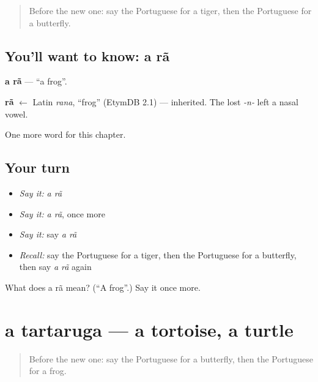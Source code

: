 \label{lesson:PT-C118-ra}



\begin{quote}
Before the new one: say the Portuguese for a tiger, then the Portuguese for a butterfly.
\end{quote}

\subsection*{You'll want to know: a rã}
\textbf{a rã} — \textquotedblleft{}a frog\textquotedblright{}.

\begin{cousinweb}
\textbf{rã} $\leftarrow$ Latin \emph{rana}, \textquotedblleft{}frog\textquotedblright{} (EtymDB 2.1) — inherited. The lost \emph{-n-} left a nasal vowel.
\end{cousinweb}

\begin{grammarlens}[title={What you've built}]
One more word for this chapter.
\end{grammarlens}

\subsection*{Your turn}
\begin{itemize}
\raggedright
  \item \emph{Say it:} \emph{a rã}
  \item \emph{Say it:} \emph{a rã}, once more
  \item \emph{Say it:} say \emph{a rã}
  \item \emph{Recall:} say the Portuguese for a tiger, then the Portuguese for a butterfly, then say \emph{a rã} again
\end{itemize}

\begin{tcolorbox}[breakable,colback=teal!4,colframe=teal!35!black,title={Before you move on}]
What does a rã mean? (\textquotedblleft{}A frog\textquotedblright{}.) Say it once more.
\end{tcolorbox}
\section[a tartaruga]{a tartaruga — a tortoise, a turtle}

\label{lesson:PT-C118-tartaruga}



\begin{quote}
Before the new one: say the Portuguese for a butterfly, then the Portuguese for a frog.
\end{quote}

